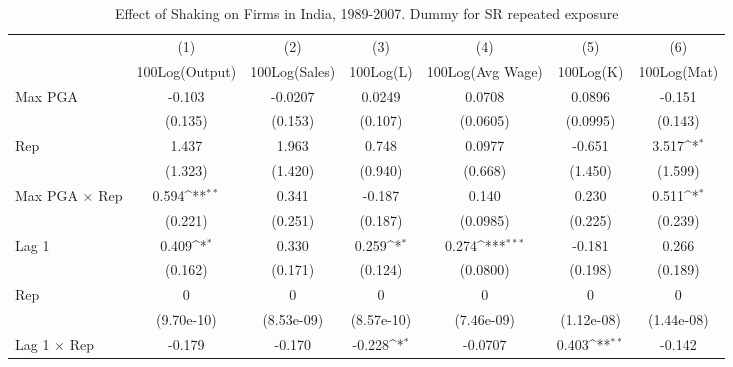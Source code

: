 \begin{table}[htbp]\centering
\def\sym#1{\ifmmode^{#1}\else\(^{#1}\)\fi}
\caption{Effect of Shaking on Firms in India, 1989-2007. Dummy for SR repeated exposure}
\begin{tabular}{l*{6}{c}}
\toprule
                &\multicolumn{1}{c}{(1)}&\multicolumn{1}{c}{(2)}&\multicolumn{1}{c}{(3)}&\multicolumn{1}{c}{(4)}&\multicolumn{1}{c}{(5)}&\multicolumn{1}{c}{(6)}\\
                &\multicolumn{1}{c}{100Log(Output)}&\multicolumn{1}{c}{100Log(Sales)}&\multicolumn{1}{c}{100Log(L)}&\multicolumn{1}{c}{100Log(Avg Wage)}&\multicolumn{1}{c}{100Log(K)}&\multicolumn{1}{c}{100Log(Mat)}\\
\midrule
Max PGA         &   -0.103         &  -0.0207         &   0.0249         &   0.0708         &   0.0896         &   -0.151         \\
                &  (0.135)         &  (0.153)         &  (0.107)         & (0.0605)         & (0.0995)         &  (0.143)         \\
\addlinespace
Rep             &    1.437         &    1.963         &    0.748         &   0.0977         &   -0.651         &    3.517\sym{*}  \\
                &  (1.323)         &  (1.420)         &  (0.940)         &  (0.668)         &  (1.450)         &  (1.599)         \\
\addlinespace
Max PGA $\times$ Rep&    0.594\sym{**} &    0.341         &   -0.187         &    0.140         &    0.230         &    0.511\sym{*}  \\
                &  (0.221)         &  (0.251)         &  (0.187)         & (0.0985)         &  (0.225)         &  (0.239)         \\
\addlinespace
Lag 1           &    0.409\sym{*}  &    0.330         &    0.259\sym{*}  &    0.274\sym{***}&   -0.181         &    0.266         \\
                &  (0.162)         &  (0.171)         &  (0.124)         & (0.0800)         &  (0.198)         &  (0.189)         \\
\addlinespace
Rep             &        0         &        0         &        0         &        0         &        0         &        0         \\
                &(9.70e-10)         &(8.53e-09)         &(8.57e-10)         &(7.46e-09)         &(1.12e-08)         &(1.44e-08)         \\
\addlinespace
Lag 1 $\times$ Rep&   -0.179         &   -0.170         &   -0.228\sym{*}  &  -0.0707         &    0.403\sym{**} &   -0.142         \\

\end{tabular}
\end{table}
